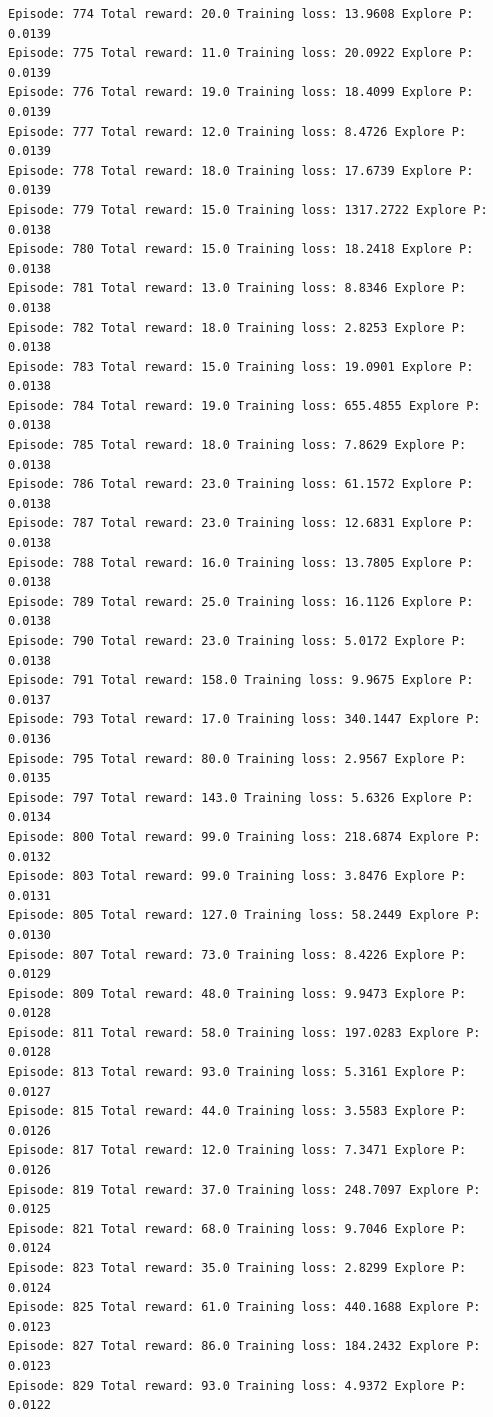 \documentclass[11pt]{article}
\begin{document}
\begin{Verbatim}[commandchars=\\\{\}]
Episode: 774 Total reward: 20.0 Training loss: 13.9608 Explore P: 0.0139
Episode: 775 Total reward: 11.0 Training loss: 20.0922 Explore P: 0.0139
Episode: 776 Total reward: 19.0 Training loss: 18.4099 Explore P: 0.0139
Episode: 777 Total reward: 12.0 Training loss: 8.4726 Explore P: 0.0139
Episode: 778 Total reward: 18.0 Training loss: 17.6739 Explore P: 0.0139
Episode: 779 Total reward: 15.0 Training loss: 1317.2722 Explore P: 0.0138
Episode: 780 Total reward: 15.0 Training loss: 18.2418 Explore P: 0.0138
Episode: 781 Total reward: 13.0 Training loss: 8.8346 Explore P: 0.0138
Episode: 782 Total reward: 18.0 Training loss: 2.8253 Explore P: 0.0138
Episode: 783 Total reward: 15.0 Training loss: 19.0901 Explore P: 0.0138
Episode: 784 Total reward: 19.0 Training loss: 655.4855 Explore P: 0.0138
Episode: 785 Total reward: 18.0 Training loss: 7.8629 Explore P: 0.0138
Episode: 786 Total reward: 23.0 Training loss: 61.1572 Explore P: 0.0138
Episode: 787 Total reward: 23.0 Training loss: 12.6831 Explore P: 0.0138
Episode: 788 Total reward: 16.0 Training loss: 13.7805 Explore P: 0.0138
Episode: 789 Total reward: 25.0 Training loss: 16.1126 Explore P: 0.0138
Episode: 790 Total reward: 23.0 Training loss: 5.0172 Explore P: 0.0138
Episode: 791 Total reward: 158.0 Training loss: 9.9675 Explore P: 0.0137
Episode: 793 Total reward: 17.0 Training loss: 340.1447 Explore P: 0.0136
Episode: 795 Total reward: 80.0 Training loss: 2.9567 Explore P: 0.0135
Episode: 797 Total reward: 143.0 Training loss: 5.6326 Explore P: 0.0134
Episode: 800 Total reward: 99.0 Training loss: 218.6874 Explore P: 0.0132
Episode: 803 Total reward: 99.0 Training loss: 3.8476 Explore P: 0.0131
Episode: 805 Total reward: 127.0 Training loss: 58.2449 Explore P: 0.0130
Episode: 807 Total reward: 73.0 Training loss: 8.4226 Explore P: 0.0129
Episode: 809 Total reward: 48.0 Training loss: 9.9473 Explore P: 0.0128
Episode: 811 Total reward: 58.0 Training loss: 197.0283 Explore P: 0.0128
Episode: 813 Total reward: 93.0 Training loss: 5.3161 Explore P: 0.0127
Episode: 815 Total reward: 44.0 Training loss: 3.5583 Explore P: 0.0126
Episode: 817 Total reward: 12.0 Training loss: 7.3471 Explore P: 0.0126
Episode: 819 Total reward: 37.0 Training loss: 248.7097 Explore P: 0.0125
Episode: 821 Total reward: 68.0 Training loss: 9.7046 Explore P: 0.0124
Episode: 823 Total reward: 35.0 Training loss: 2.8299 Explore P: 0.0124
Episode: 825 Total reward: 61.0 Training loss: 440.1688 Explore P: 0.0123
Episode: 827 Total reward: 86.0 Training loss: 184.2432 Explore P: 0.0123
Episode: 829 Total reward: 93.0 Training loss: 4.9372 Explore P: 0.0122

\end{Verbatim}
\end{document}
